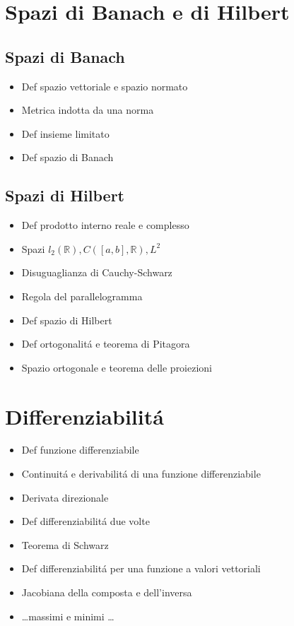 \documentclass[10pt,a4paper, twocolumn]{article}
\newcommand{\R}{\mathbb{R}}
\renewcommand{\,}{\text{, }}
\begin{document}
\section{Spazi di Banach e di Hilbert}
\subsection{Spazi di Banach}
\begin{itemize}
    \item Def spazio vettoriale e spazio normato
    \item Metrica indotta da una norma
    \item Def insieme limitato
    \item Def spazio di Banach
\end{itemize}
\subsection{Spazi di Hilbert}
\begin{itemize}
    \item Def prodotto interno reale e complesso
    \item Spazi $l_2(\R), C([a,b],\R), L^2$
    \item Disuguaglianza di Cauchy-Schwarz
    \item Regola del parallelogramma
    \item Def spazio di Hilbert
    \item Def ortogonalit\'a e teorema di Pitagora
    \item Spazio ortogonale e teorema delle proiezioni
\end{itemize}

\section{Differenziabilit\'a}
\begin{itemize}
    \item Def funzione differenziabile
    \item Continuit\'a e derivabilit\'a di una funzione differenziabile
    \item Derivata direzionale
    \item Def differenziabilit\'a due volte
    \item Teorema di Schwarz
    \item Def differenziabilit\'a per una funzione a valori vettoriali
    \item Jacobiana della composta e dell'inversa
    \item \dots massimi e minimi \dots
\end{itemize}
\end{document}
